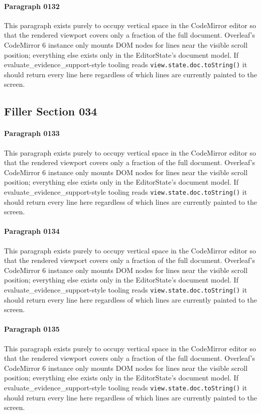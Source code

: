 \documentclass{article}
\begin{document}
\paragraph{Paragraph 0132}
This paragraph exists purely to occupy vertical space in the CodeMirror editor so that the rendered viewport covers only a fraction of the full document. Overleaf's CodeMirror 6 instance only mounts DOM nodes for lines near the visible scroll position; everything else exists only in the EditorState's document model. If evaluate\_evidence\_support-style tooling reads \texttt{view.state.doc.toString()} it should return every line here regardless of which lines are currently painted to the screen.

\subsection{Filler Section 034}
\paragraph{Paragraph 0133}
This paragraph exists purely to occupy vertical space in the CodeMirror editor so that the rendered viewport covers only a fraction of the full document. Overleaf's CodeMirror 6 instance only mounts DOM nodes for lines near the visible scroll position; everything else exists only in the EditorState's document model. If evaluate\_evidence\_support-style tooling reads \texttt{view.state.doc.toString()} it should return every line here regardless of which lines are currently painted to the screen.

\paragraph{Paragraph 0134}
This paragraph exists purely to occupy vertical space in the CodeMirror editor so that the rendered viewport covers only a fraction of the full document. Overleaf's CodeMirror 6 instance only mounts DOM nodes for lines near the visible scroll position; everything else exists only in the EditorState's document model. If evaluate\_evidence\_support-style tooling reads \texttt{view.state.doc.toString()} it should return every line here regardless of which lines are currently painted to the screen.

\paragraph{Paragraph 0135}
This paragraph exists purely to occupy vertical space in the CodeMirror editor so that the rendered viewport covers only a fraction of the full document. Overleaf's CodeMirror 6 instance only mounts DOM nodes for lines near the visible scroll position; everything else exists only in the EditorState's document model. If evaluate\_evidence\_support-style tooling reads \texttt{view.state.doc.toString()} it should return every line here regardless of which lines are currently painted to the screen.
\end{document}
